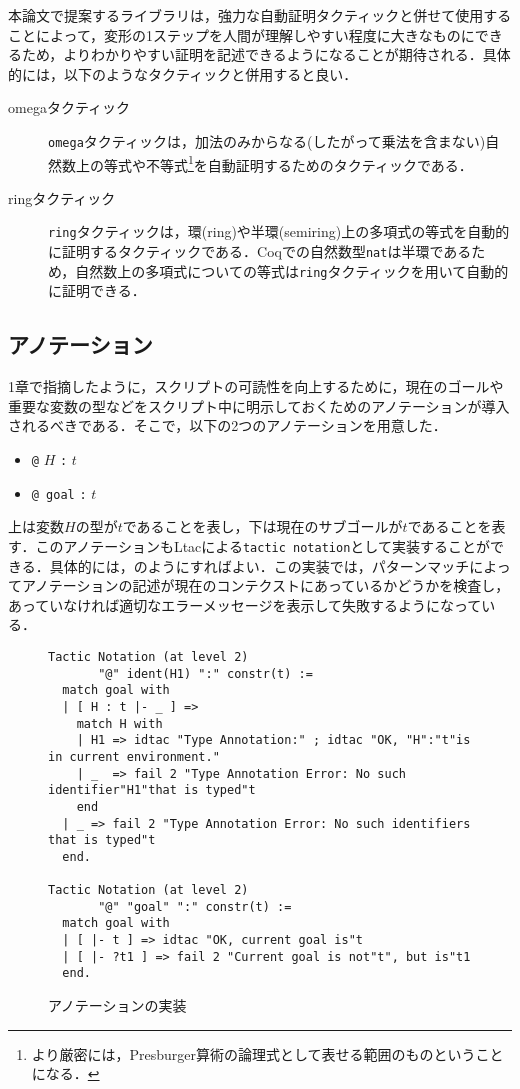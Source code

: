 \documentclass[submit]{ipsj}
\begin{document}
本論文で提案するライブラリは，強力な自動証明タクティックと併せて使用することによって，変形の1ステップを人間が理解しやすい程度に大きなものにできるため，よりわかりやすい証明を記述できるようになることが期待される．具体的には，以下のようなタクティックと併用すると良い．
\begin{description}
\item[omegaタクティック] \verb+omega+タクティックは，加法のみからなる(したがって乗法を含まない)自然数上の等式や不等式\footnote{より厳密には，Presburger算術の論理式として表せる範囲のものということになる．}を自動証明するためのタクティックである．
\item[ringタクティック] \verb+ring+タクティックは，環(ring)や半環(semiring)上の多項式の等式を自動的に証明するタクティックである．Coqでの自然数型\verb~nat~は半環であるため，自然数上の多項式についての等式は\verb+ring+タクティックを用いて自動的に証明できる．
\end{description}

\subsection{アノテーション}

1章で指摘したように，スクリプトの可読性を向上するために，現在のゴールや重要な変数の型などをスクリプト中に明示しておくためのアノテーションが導入されるべきである．そこで，以下の2つのアノテーションを用意した．
\begin{itemize}
\item \verb+@+ $H$ \verb+:+ $t$
\item \verb+@ goal+ \verb+:+ $t$
\end{itemize}
上は変数$H$の型が$t$であることを表し，下は現在のサブゴールが$t$であることを表す．このアノテーションもLtacによる\verb+tactic notation+として実装することができる．具体的には，のようにすればよい．この実装では，パターンマッチによってアノテーションの記述が現在のコンテクストにあっているかどうかを検査し，あっていなければ適切なエラーメッセージを表示して失敗するようになっている．
\begin{figure}[t]
\begin{mdframed}
\begin{verbatim}
Tactic Notation (at level 2)
       "@" ident(H1) ":" constr(t) :=
  match goal with
  | [ H : t |- _ ] =>
    match H with
    | H1 => idtac "Type Annotation:" ; idtac "OK, "H":"t"is in current environment."
    | _  => fail 2 "Type Annotation Error: No such identifier"H1"that is typed"t
    end
  | _ => fail 2 "Type Annotation Error: No such identifiers that is typed"t
  end.

Tactic Notation (at level 2)
       "@" "goal" ":" constr(t) :=
  match goal with
  | [ |- t ] => idtac "OK, current goal is"t
  | [ |- ?t1 ] => fail 2 "Current goal is not"t", but is"t1
  end.
\end{verbatim}
\end{mdframed}
\caption{アノテーションの実装}
\label{fig:annotation}
\end{figure}
\end{document}
